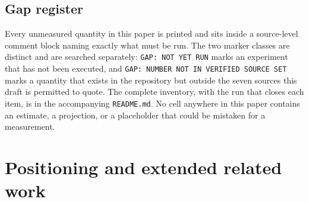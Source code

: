 \subsection{Gap register}
\label{app:gaps}

Every unmeasured quantity in this paper is printed \XXX{} and sits inside a source-level comment block naming exactly what must be run.
The two marker classes are distinct and are searched separately:
\texttt{GAP: NOT YET RUN} marks an experiment that has not been executed, and
\texttt{GAP: NUMBER NOT IN VERIFIED SOURCE SET} marks a quantity that exists in the repository but outside the seven sources this draft is permitted to quote.
The complete inventory, with the run that closes each item, is in the accompanying \texttt{README.md}.
No cell anywhere in this paper contains an estimate, a projection, or a placeholder that could be mistaken for a measurement.

\section{Positioning and extended related work}
\label{app:positioning}

